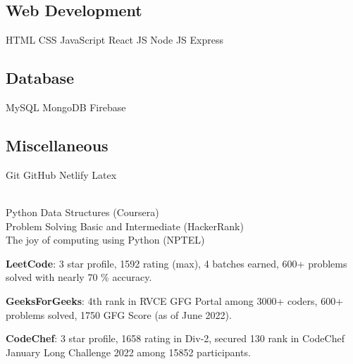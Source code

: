 \documentclass[a4paper]{MagicalCV}
\begin{document}
\begin{minipage}[t]{0.33\textwidth}
\subsection{Web Development}
HTML \textbullet{} CSS \textbullet{} JavaScript \textbullet{} React JS \textbullet{} Node JS \textbullet{} Express
\sectionsep
\subsection{Database}
MySQL \textbullet{} MongoDB \textbullet{} Firebase 
\sectionsep
\subsection{Miscellaneous}
Git \textbullet{} GitHub \textbullet{} Netlify\textbullet{} Latex
\sectionsep 

 \vspace{\topsep}\\ %
Python Data Structures (Coursera)\\
Problem Solving Basic and Intermediate (HackerRank)\\
The joy of computing using Python (NPTEL)


\vspace{\topsep} %
 \justify \textbf{LeetCode}: 3 star profile, 1592 rating (max), 4 batches earned, 600+ problems solved with nearly 70 \% accuracy.


\vspace{\topsep} %
 \justify \textbf{GeeksForGeeks}: 4th rank in RVCE GFG Portal among 3000+ coders, 600+ problems solved, 1750 GFG Score (as of June 2022).

\vspace{\topsep} %
\justify \textbf{CodeChef}: 3 star profile, 1658 rating in Div-2, secured 130 rank in CodeChef January Long Challenge 2022 among 15852 participants.


\end{minipage} 
\end{document}
